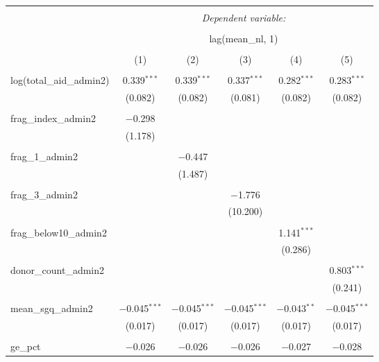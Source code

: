 
\begin{table}[!htbp] \centering 
  \caption{} 
  \label{} 
\begin{tabular}{@{\extracolsep{5pt}}lccccc} 
\\[-1.8ex]\hline 
\hline \\[-1.8ex] 
 & \multicolumn{5}{c}{\textit{Dependent variable:}} \\ 
\cline{2-6} 
\\[-1.8ex] & \multicolumn{5}{c}{lag(mean\_nl, 1)} \\ 
\\[-1.8ex] & (1) & (2) & (3) & (4) & (5)\\ 
\hline \\[-1.8ex] 
 log(total\_aid\_admin2) & 0.339$^{***}$ & 0.339$^{***}$ & 0.337$^{***}$ & 0.282$^{***}$ & 0.283$^{***}$ \\ 
  & (0.082) & (0.082) & (0.081) & (0.082) & (0.082) \\ 
  & & & & & \\ 
 frag\_index\_admin2 & $-$0.298 &  &  &  &  \\ 
  & (1.178) &  &  &  &  \\ 
  & & & & & \\ 
 frag\_1\_admin2 &  & $-$0.447 &  &  &  \\ 
  &  & (1.487) &  &  &  \\ 
  & & & & & \\ 
 frag\_3\_admin2 &  &  & $-$1.776 &  &  \\ 
  &  &  & (10.200) &  &  \\ 
  & & & & & \\ 
 frag\_below10\_admin2 &  &  &  & 1.141$^{***}$ &  \\ 
  &  &  &  & (0.286) &  \\ 
  & & & & & \\ 
 donor\_count\_admin2 &  &  &  &  & 0.803$^{***}$ \\ 
  &  &  &  &  & (0.241) \\ 
  & & & & & \\ 
 mean\_sgq\_admin2 & $-$0.045$^{***}$ & $-$0.045$^{***}$ & $-$0.045$^{***}$ & $-$0.043$^{**}$ & $-$0.045$^{***}$ \\ 
  & (0.017) & (0.017) & (0.017) & (0.017) & (0.017) \\ 
  & & & & & \\ 
 ge\_pct & $-$0.026 & $-$0.026 & $-$0.026 & $-$0.027 & $-$0.028 \\ 

\end{tabular}
\end{table}
